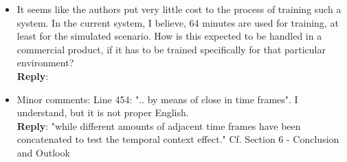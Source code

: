 \documentclass[11pt, technote, letterpaper, oneside, onecolumn]{IEEEtran}
\begin{document}
\begin{itemize}
\item It seems like the authors put very little cost to the process of training such a system. In the current system, I believe, 64 minutes are used for training, at least for the simulated scenario. How is this expected to be handled in a commercial product, if it has to be trained specifically for that particular environment?\\
\textbf{Reply}:

\item Minor comments: Line 454: ".. by means of close in time frames". I understand, but it is not proper English.\\
\textbf{Reply}: "while different amounts of adjacent time frames have been concatenated to test the temporal context effect." Cf. Section 6 - Conclusion and Outlook
\end{itemize}

\newpage
\end{document}
